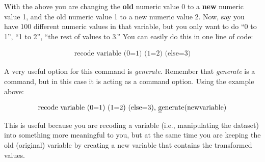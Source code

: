 \documentclass[paper=a4, fontsize=11pt]{scrartcl} %
\numberwithin{equation}{section} %
\numberwithin{figure}{section} %
\numberwithin{table}{section} %
\begin{document}
With the above you are changing the \textbf{old} numeric value 0 to a \textbf{new} numeric value 1, and the old numeric value 1 to a new numeric value 2. Now, say you have 100 different numeric values in that variable, but you only want to do ``0 to 1'', ``1 to 2'', ``the rest of values to 3.'' You can easily do this in one line of code:

\begin{align}
\text{recode variable (0=1) (1=2) (else=3)}
\end{align}

A very useful option for this command is \textit{\underline{g}enerate}. Remember that \textit{\underline{g}enerate} is a command, but in this case it is acting as a command option. Using the example above:

\begin{align}
\text{recode variable (0=1) (1=2) (else=3), \underline{g}enerate(newvariable)}
\end{align}

This is useful because you are recoding a variable (i.e., manipulating the dataset) into something more meaningful to you, but at the same time you are keeping the old (original) variable by creating a new variable that contains the transformed values. 

\end{document}
